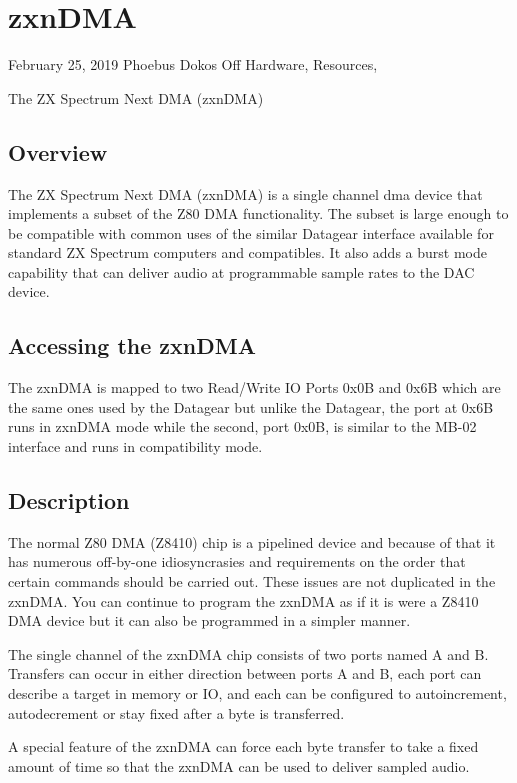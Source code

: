 \chapter{zxnDMA}
\begin{multicols}{2}
 February 25, 2019  Phoebus Dokos  Off  Hardware, Resources,

The ZX Spectrum Next DMA (zxnDMA)

\section{Overview}

The ZX Spectrum Next DMA (zxnDMA) is a single channel dma device that
implements a subset of the Z80 DMA functionality. The subset is large
enough to be compatible with common uses of the similar Datagear
interface available for standard ZX Spectrum computers and
compatibles. It also adds a burst mode capability that can deliver
audio at programmable sample rates to the DAC device.

\section{Accessing the zxnDMA}
The zxnDMA is mapped to two Read/Write IO Ports 0x0B and 0x6B which
are the same ones used by the Datagear but unlike the Datagear, the
port at 0x6B runs in zxnDMA mode while the second, port 0x0B, is
similar to the MB-02 interface and runs in compatibility mode.




\section{Description}
The normal Z80 DMA (Z8410) chip is a pipelined device and because of
that it has numerous off-by-one idiosyncrasies and requirements on the
order that certain commands should be carried out. These issues are
not duplicated in the zxnDMA. You can continue to program the zxnDMA
as if it is were a Z8410 DMA device but it can also be programmed in a
simpler manner.

The single channel of the zxnDMA chip consists of two ports named A
and B. Transfers can occur in either direction between ports A and B,
each port can describe a target in memory or IO, and each can be
configured to autoincrement, autodecrement or stay fixed after a byte
is transferred.

A special feature of the zxnDMA can force each byte transfer to take a
fixed amount of time so that the zxnDMA can be used to deliver sampled
audio.


\end{multicols}

